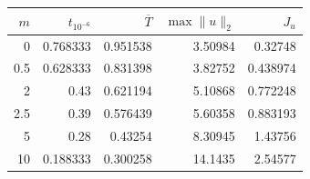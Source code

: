 \begin{tabular}{rrrrr}\toprule
$m$ & $t_{10^{-6}}$ & $\overline T$ & $\max\|u\|_2$ & $J_u$\\\midrule
0 & 0.768333 & 0.951538 & 3.50984 & 0.32748 \\
0.5 & 0.628333 & 0.831398 & 3.82752 & 0.438974 \\
2 & 0.43 & 0.621194 & 5.10868 & 0.772248 \\
2.5 & 0.39 & 0.576439 & 5.60358 & 0.883193 \\
5 & 0.28 & 0.43254 & 8.30945 & 1.43756 \\
10 & 0.188333 & 0.300258 & 14.1435 & 2.54577 \\
\bottomrule\end{tabular}
